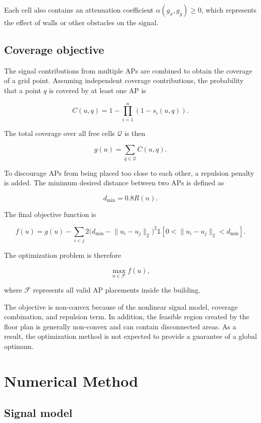 \documentclass[11pt]{article}
\begin{document}
Each cell also contains an attenuation coefficient
$\alpha(g_x,g_y)\geq0$, which represents the effect of walls or other
obstacles on the signal.



\subsection{Coverage objective}

The signal contributions from multiple APs are combined to obtain the
coverage of a grid point. Assuming independent coverage contributions,
the probability that a point $q$ is covered by at least one AP is

\[
C(u,q)=1-\prod_{i=1}^{n}(1-s_i(u,q)).
\]

The total coverage over all free cells $\mathcal{Q}$ is then

\[
g(u)=\sum_{q\in\mathcal{Q}}C(u,q).
\]

To discourage APs from being placed too close to each other, a
repulsion penalty is added. The minimum desired distance between two
APs is defined as

\[
d_{\min}=0.8R(n).
\]

The final objective function is

\[
f(u)=g(u)
-\sum_{i<j}
2\big(d_{\min}-\lVert u_i-u_j\rVert_2\big)^2
\mathbb{1}\!\left[
0<\lVert u_i-u_j\rVert_2<d_{\min}
\right].
\]

The optimization problem is therefore

\[
\max_{u\in\mathcal{F}} f(u),
\]

where $\mathcal{F}$ represents all valid AP placements inside the
building.

The objective is non-convex because of the nonlinear signal model,
coverage combination, and repulsion term. In addition, the feasible
region created by the floor plan is generally non-convex and can
contain disconnected areas. As a result, the optimization method is
not expected to provide a guarantee of a global optimum.

\section{Numerical Method}
\subsection{Signal model}
\end{document}
